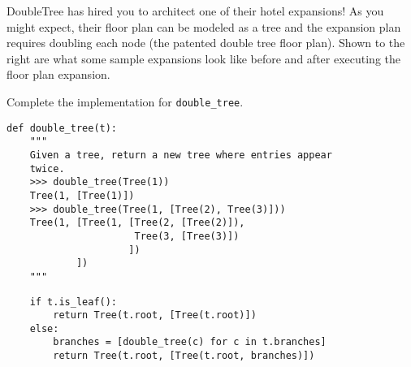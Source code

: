 \question DoubleTree has hired you to architect one of their hotel expansions!
As you might expect, their floor plan can be modeled as a tree and the expansion
plan requires doubling each node (the patented double tree floor plan). Shown to
the right are what some sample expansions look like before and after executing
the floor plan expansion.

Complete the implementation for \lstinline$double_tree$.

\begin{lstlisting}
def double_tree(t):
    """
    Given a tree, return a new tree where entries appear
    twice.
    >>> double_tree(Tree(1))
    Tree(1, [Tree(1)])
    >>> double_tree(Tree(1, [Tree(2), Tree(3)]))
    Tree(1, [Tree(1, [Tree(2, [Tree(2)]),
                      Tree(3, [Tree(3)])
                     ])
            ])
    """
\end{lstlisting}

\begin{solution}[1in]
\begin{lstlisting}
    if t.is_leaf():
        return Tree(t.root, [Tree(t.root)])
    else:
        branches = [double_tree(c) for c in t.branches]
        return Tree(t.root, [Tree(t.root, branches)])
\end{lstlisting}
\end{solution}
